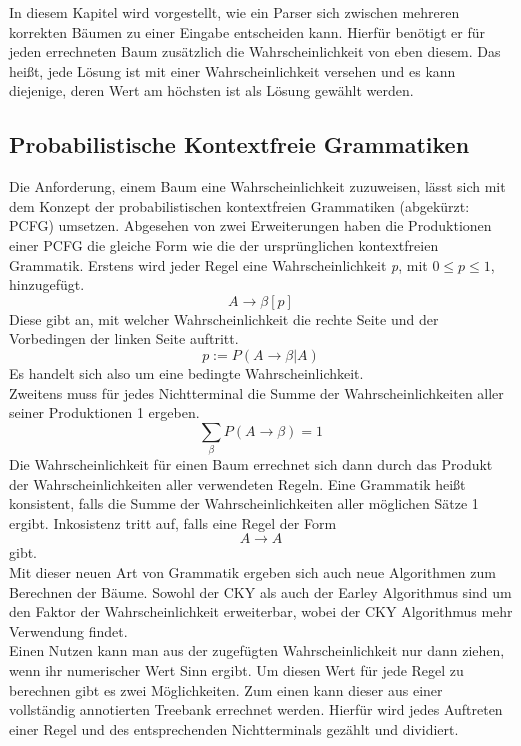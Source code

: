 In diesem Kapitel wird vorgestellt, wie ein Parser sich zwischen mehreren korrekten Bäumen zu einer Eingabe entscheiden kann. Hierfür benötigt er für jeden errechneten Baum zusätzlich die Wahrscheinlichkeit von eben diesem. Das heißt, jede Lösung ist mit einer Wahrscheinlichkeit versehen und es kann diejenige, deren Wert am höchsten ist als Lösung gewählt werden. %

\subsection{Probabilistische Kontextfreie Grammatiken}
\label{sec:nlp:stat-parsen:pcfg}

Die Anforderung, einem Baum eine Wahrscheinlichkeit zuzuweisen, lässt sich mit dem Konzept der probabilistischen kontextfreien Grammatiken (abgekürzt: PCFG) umsetzen. Abgesehen von zwei Erweiterungen haben die Produktionen einer PCFG die gleiche Form wie die der ursprünglichen kontextfreien Grammatik. Erstens wird jeder Regel eine Wahrscheinlichkeit \textit{p}, mit \( 0 \leq p \leq 1 \), hinzugefügt.
\[ A \to \beta  [p] \]
Diese gibt an, mit welcher Wahrscheinlichkeit die rechte Seite und der Vorbedingen der linken Seite auftritt.
\[ p := P(A \to \beta | A) \] 
Es handelt sich also um eine bedingte Wahrscheinlichkeit.\\ 
Zweitens muss für jedes Nichtterminal die Summe der Wahrscheinlichkeiten aller seiner Produktionen 1 ergeben.
\[ \sum_{\beta} P(A \to \beta) = 1 \] 
Die Wahrscheinlichkeit für einen Baum errechnet sich dann durch das Produkt der Wahrscheinlichkeiten aller verwendeten Regeln. Eine Grammatik heißt konsistent, falls die Summe der Wahrscheinlichkeiten aller möglichen Sätze 1 ergibt. Inkosistenz tritt auf, falls eine Regel der Form 
\[ A \to A \]
gibt.\\
Mit dieser neuen Art von Grammatik ergeben sich auch neue Algorithmen zum Berechnen der Bäume. Sowohl der CKY als auch der Earley Algorithmus sind um den Faktor der Wahrscheinlichkeit erweiterbar, wobei der CKY Algorithmus mehr Verwendung findet.\\ %
Einen Nutzen kann man aus der zugefügten Wahrscheinlichkeit nur dann ziehen, wenn ihr numerischer Wert Sinn ergibt. Um diesen Wert für jede Regel zu berechnen gibt es zwei Möglichkeiten. Zum einen kann dieser aus einer vollständig annotierten Treebank errechnet werden. Hierfür wird jedes Auftreten einer Regel und des entsprechenden Nichtterminals gezählt und dividiert. 
